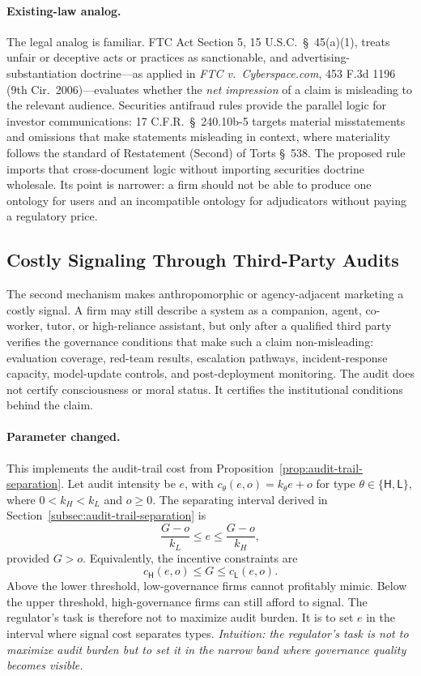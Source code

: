 \paragraph{Existing-law analog.}
The legal analog is familiar. FTC Act Section 5, 15 U.S.C.\ \S~45(a)(1), treats unfair or deceptive acts
or practices as sanctionable, and advertising-substantiation doctrine---as applied in
\emph{FTC v.\ Cyberspace.com}, 453 F.3d 1196 (9th Cir.\ 2006)---evaluates
whether the \emph{net impression} of a claim is misleading to the relevant
audience. Securities antifraud rules provide the parallel logic for investor
communications: 17 C.F.R.\ \S~240.10b-5 targets material misstatements and omissions that
make statements misleading in context, where materiality follows the standard of
Restatement (Second) of Torts \S~538. The proposed rule imports that
cross-document logic without importing securities doctrine wholesale. Its point
is narrower: a firm should not be able to produce one ontology for users and an
incompatible ontology for adjudicators without paying a regulatory price.

\subsection{Costly Signaling Through Third-Party Audits}
\label{subsec:costly-signaling-audits}

The second mechanism makes anthropomorphic or agency-adjacent marketing a
costly signal. A firm may still describe a system as a companion, agent,
co-worker, tutor, or high-reliance assistant, but only after a qualified third
party verifies the governance conditions that make such a claim non-misleading:
evaluation coverage, red-team results, escalation pathways, incident-response
capacity, model-update controls, and post-deployment monitoring. The audit does
not certify consciousness or moral status. It certifies the institutional
conditions behind the claim.

\paragraph{Parameter changed.}
This implements the audit-trail cost from Proposition~\ref{prop:audit-trail-separation}.
Let audit intensity be $e$, with $c_\theta(e,o)=k_\theta e+o$ for
type $\theta\in\{\mathsf{H},\mathsf{L}\}$, where $0<k_H<k_L$ and $o\ge 0$. The separating
interval derived in Section~\ref{subsec:audit-trail-separation} is
\[
\frac{G-o}{k_L}\leq e\leq \frac{G-o}{k_H},
\]
provided $G>o$. Equivalently, the incentive constraints are
\[
c_\mathsf{H}(e,o)\leq G \leq c_\mathsf{L}(e,o).
\]
Above the lower threshold, low-governance firms cannot profitably mimic. Below
the upper threshold, high-governance firms can still afford to signal. The
regulator's task is therefore not to maximize audit burden. It is to set $e$ in
the interval where signal cost separates types.
\emph{Intuition: the regulator's task is not to maximize audit burden but to set it in the narrow band where governance quality becomes visible.}

